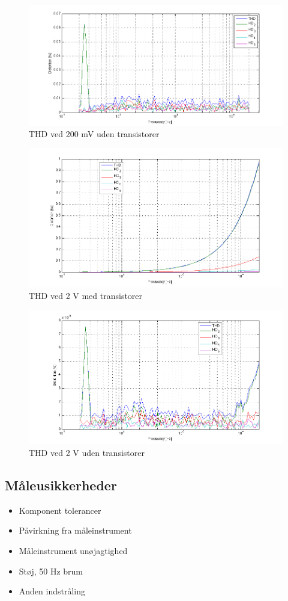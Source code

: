 \begin{figure}[h]
\centering
\includegraphics[width=\textwidth]{maalerapporter/indgangsvaelger/maalinger/opa/mic-200mv-opa-muxudgang-uden-transistor thd.png}
\caption{THD ved 200 mV uden transistorer}
\label{fig:apind:200mvu}
\end{figure}

\begin{figure}[h]
\centering
\includegraphics[width=\textwidth]{maalerapporter/indgangsvaelger/maalinger/opa/mic-2v-opa-muxudgang-thd.png}
\caption{THD ved 2 V med transistorer}
\label{fig:apind:2vm}
\end{figure}


\begin{figure}[h]
\centering
\includegraphics[width=\textwidth]{maalerapporter/indgangsvaelger/maalinger/opa/mic-2v-opa-muxudgang-uden-transistor-thd.png}
\caption{THD ved 2 V uden transistorer}
\label{fig:apind:2vu}
\end{figure}

\clearpage
\subsection*{Måleusikkerheder}
\begin{itemize}
\item Komponent tolerancer
\item Påvirkning fra måleinstrument
\item Måleinstrument unøjagtighed
\item Støj, 50 Hz brum
\item Anden indstråling
\end{itemize}